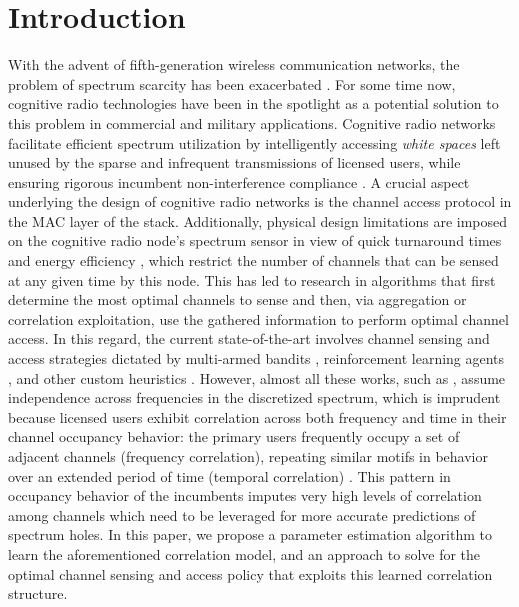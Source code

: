 \documentclass[10pt,twocolumn]{IEEEtran}
\begin{document}
\section{Introduction}\label{I}
With the advent of fifth-generation wireless communication networks, the problem of spectrum scarcity has been exacerbated \cite{7158089}. For some time now, cognitive radio technologies have been in the spotlight as a potential solution to this problem in commercial and military applications. Cognitive radio networks facilitate efficient spectrum utilization by intelligently accessing \emph{white spaces} left unused by the sparse and infrequent transmissions of licensed users, while ensuring rigorous incumbent non-interference compliance \cite{4562537}. A crucial aspect underlying the design of cognitive radio networks is the channel access protocol in the MAC layer of the stack. Additionally, physical design limitations are imposed on the cognitive radio node's spectrum sensor in view of quick turnaround times and energy efficiency \cite{5990482}, which restrict the number of channels that can be sensed at any given time by this node. This has led to research in algorithms that first determine the most optimal channels to sense and then, via aggregation or correlation exploitation, use the gathered information to perform optimal channel access. In this regard, the current state-of-the-art involves channel sensing and access strategies dictated by multi-armed bandits \cite{7094730}, reinforcement learning agents \cite{6507570}, and other custom heuristics \cite{6956794, 4554696}. However, almost all these works, such as \cite{7094730, 6507570}, assume independence across frequencies in the discretized spectrum, which is imprudent because licensed users exhibit correlation across both frequency and time in their channel occupancy behavior: the primary users frequently occupy a set of adjacent channels (frequency correlation), repeating similar motifs in behavior over an extended period of time (temporal correlation) \cite{6188346, 4213046,McHenry:2006:CSO:1234388.1234389}. This pattern in occupancy behavior of the incumbents imputes very high levels of correlation among channels which need to be leveraged for more accurate predictions of spectrum holes. In this paper, we propose a parameter estimation algorithm to learn the aforementioned correlation model, and an approach to solve for the optimal channel sensing and access policy that exploits this learned correlation structure.
\end{document}
